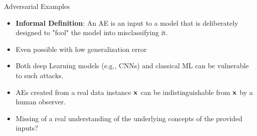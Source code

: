 \documentclass[11pt,compress,t,notes=noshow, aspectratio=169, xcolor=table]{beamer}
\begin{document}
\begin{vbframe}[c]{Adversarial Examples}
\begin{itemize}
    \item \textbf{Informal Definition}: An AE is an input to a model that is deliberately designed to "fool" the model into misclassifying it.
    \item Even possible with low generalization error
    \item Both deep Learning models (e.g., CNNs) and classical ML can be vulnerable to such attacks.
    \item AEs created from a real data instance $\xv$ can be indistinguishable from $\xv$ by a human observer. 
    \item Missing of a real understanding of the underlying concepts of the provided inputs?
\end{itemize}
\end{vbframe}
\end{document}

